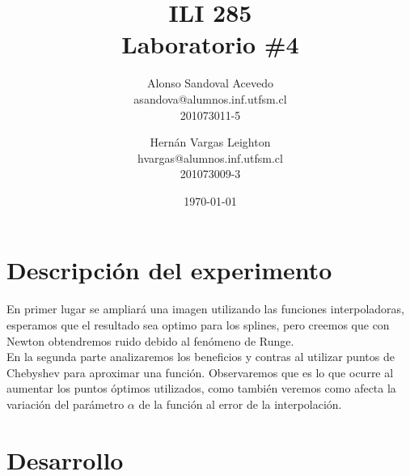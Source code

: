 \documentclass[spanish, fleqn]{article}
\title{ILI 285 \\ Laboratorio \#4}
\author{Alonso Sandoval Acevedo\\asandova@alumnos.inf.utfsm.cl\\201073011-5 \and 
		Hernán Vargas Leighton\\hvargas@alumnos.inf.utfsm.cl\\201073009-3}
\date{\today}
\begin{document}
\maketitle

\thispagestyle{empty}

\section{Descripción del experimento}
	En primer lugar se ampliará una imagen utilizando las funciones
	interpoladoras, esperamos que el resultado sea optimo para los splines,
	pero creemos que con Newton obtendremos ruido debido al	fenómeno de Runge.\\
	En la segunda parte analizaremos los beneficios y contras al utilizar puntos
	de Chebyshev para aproximar una función. Observaremos que es lo que ocurre
	al aumentar los puntos óptimos utilizados, como también veremos como afecta
	la variación del	parámetro $\alpha$  de la función al error de  la
	interpolación.

\section{Desarrollo}
\end{document}

